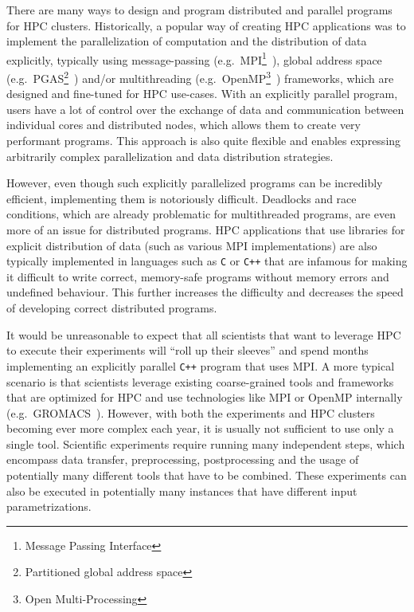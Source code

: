 There are many ways to design and program distributed and parallel programs for HPC clusters.
Historically, a popular way of creating HPC applications was to implement the parallelization of
computation and the distribution of data explicitly, typically using message-passing (e.g.\
MPI\footnote{Message Passing Interface}~\cite{mpi}), global address space (e.g.\
PGAS\footnote{Partitioned global address space}~\cite{pgas}) and/or multithreading (e.g.\
OpenMP\footnote{Open Multi-Processing}~\cite{openmp}) frameworks, which are designed and fine-tuned
for HPC use-cases. With an explicitly parallel program, users have a lot of control over the
exchange of data and communication between individual cores and distributed nodes, which allows
them to create very performant programs. This approach is also quite flexible and enables
expressing arbitrarily complex parallelization and data distribution strategies.

However, even though such explicitly parallelized programs can be incredibly efficient,
implementing them is notoriously difficult. Deadlocks and race conditions, which are already
problematic for multithreaded programs, are even more of an issue for distributed programs. HPC
applications that use libraries for explicit distribution of data (such as various MPI
implementations) are also typically implemented in languages such as \texttt{C} or
\texttt{C++} that are infamous for making it difficult to write correct, memory-safe
programs without memory errors and undefined behaviour. This further increases the difficulty and
decreases the speed of developing correct distributed programs.

It would be unreasonable to expect that all scientists that want to leverage HPC to execute their
experiments will ``roll up their sleeves'' and spend months implementing an explicitly parallel
\texttt{C++} program that uses MPI. A more typical scenario is that scientists leverage
existing coarse-grained tools and frameworks that are optimized for HPC and use technologies like
MPI or OpenMP internally (e.g.\ GROMACS~\cite{gromacs}). However, with both the experiments
and HPC clusters becoming ever more complex each year, it is usually not sufficient to use only a
single tool. Scientific experiments require running many independent steps, which encompass data
transfer, preprocessing, postprocessing and the usage of potentially many different tools that have
to be combined. These experiments can also be executed in potentially many instances that have
different input parametrizations.

